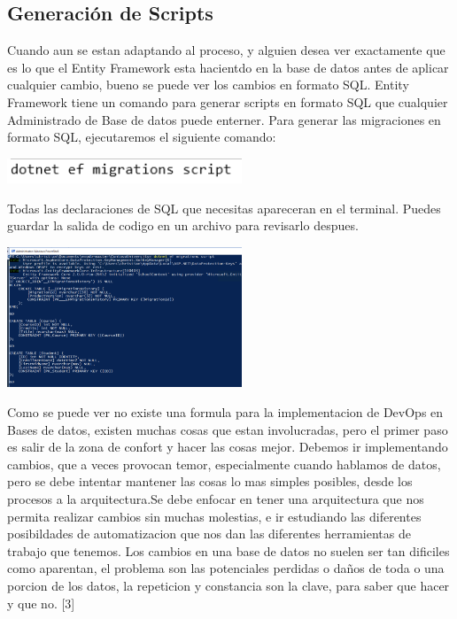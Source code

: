 \documentclass[twoside,twocolumn]{article}
\begin{document}
\subsection{Generación de Scripts}
Cuando aun se estan adaptando al proceso, y alguien desea ver exactamente que es lo que el Entity Framework esta hacientdo en la base de datos antes de aplicar cualquier cambio, bueno se puede ver los cambios en formato SQL. Entity Framework tiene un comando para generar scripts en formato SQL que cualquier Administrado de Base de datos puede enterner.
Para generar las migraciones en formato SQL, ejecutaremos el siguiente comando:
 \begin{center}
	\includegraphics[width=7cm]{./Imagenes/codigo3} 
	\end{center}
Todas las declaraciones de SQL que necesitas apareceran en el terminal. Puedes guardar la salida de codigo en un archivo para revisarlo despues.
 \begin{center}
	\includegraphics[width=7cm]{./Imagenes/scripts} 
	\end{center}
Como se puede ver no existe una formula para la implementacion de DevOps en Bases de datos, existen muchas cosas que estan involucradas, pero el primer paso es salir de la zona de confort y hacer las cosas mejor. Debemos ir implementando cambios, que a veces provocan temor, especialmente cuando hablamos de datos, pero se debe intentar mantener las cosas lo mas simples posibles, desde los procesos a la arquitectura.Se debe enfocar en tener una arquitectura que nos permita realizar cambios sin muchas molestias, e ir estudiando las diferentes posibildades de automatizacion que nos dan las diferentes herramientas de trabajo que tenemos. Los cambios en una base de datos no suelen ser tan dificiles como aparentan, el problema son las potenciales perdidas o daños de toda o una porcion de los datos, la repeticion y constancia son la clave, para saber que hacer y que no. [3]
\end{document}
